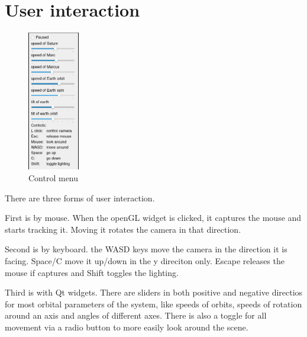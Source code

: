 \documentclass[10pt]{article}
\begin{document}
    \pagebreak
    \section{User interaction}

        \begin{figure}
            \caption{Control menu}
            \includegraphics[width=0.2\textwidth]{controls}
        \end{figure}

        There are three forms of user interaction.

        First is by mouse. When the openGL widget is clicked, it captures the
        mouse and starts tracking it. Moving it rotates the camera in that direction.

        Second is by keyboard. the WASD keys move the camera in the direction
        it is facing. Space/C move it up/down in the y direciton only. Escape
        releases the mouse if captures and Shift toggles the lighting.

        Third is with Qt widgets. There are sliders in both positive and
        negative directios for most orbital parameters of the system, like
        speeds of orbits, speeds of rotation around an axis and angles of
        different axes. There is also a toggle for all movement via a radio
        button to more easily look around the scene.
\end{document}
